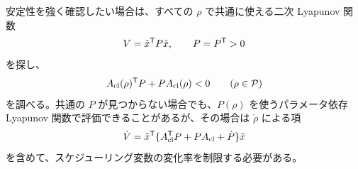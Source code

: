 安定性を強く確認したい場合は、すべての $\rho$ で共通に使える二次 Lyapunov 関数
\begin{equation}
  V=\tilde{x}^{\mathsf{T}} P\tilde{x},\qquad P=P^{\mathsf{T}}>0
\end{equation}
を探し、
\begin{equation}
  A_\mathrm{cl}(\rho)^{\mathsf{T}} P+P A_\mathrm{cl}(\rho)<0
  \qquad(\rho\in\mathcal{P})
\end{equation}
を調べる。共通の $P$ が見つからない場合でも、$P(\rho)$ を使うパラメータ依存 Lyapunov 関数で評価できることがあるが、その場合は $\dot{\rho}$ による項
\begin{equation}
  \dot{V}
  =
  \tilde{x}^{\mathsf{T}}
  \{A_\mathrm{cl}^{\mathsf{T}} P+P A_\mathrm{cl}+\dot{P}\}
  \tilde{x}
\end{equation}
を含めて、スケジューリング変数の変化率を制限する必要がある。

